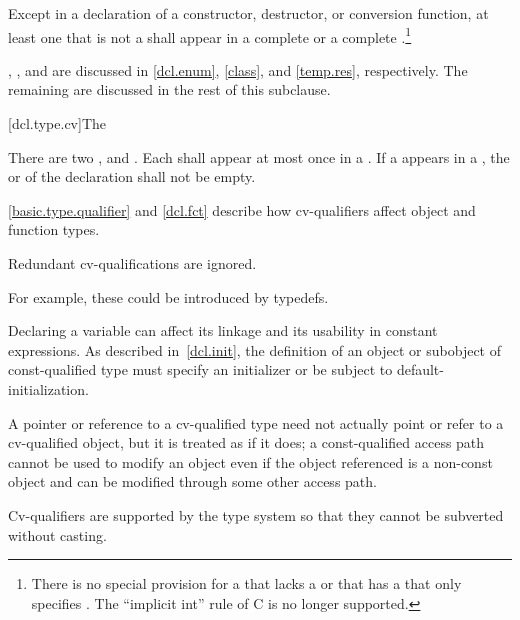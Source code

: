 \pnum
Except in a declaration of a constructor, destructor, or conversion
function, at least one  that is not a
 shall appear in a complete
 or a complete
.\footnote{There is no special
provision for a  that
lacks a  or that has a
 that only specifies .
The ``implicit int'' rule of C is no longer supported.}

\pnum
\begin{note}
,
,
and
are discussed
in
\ref{dcl.enum},
\ref{class},
and
\ref{temp.res}, respectively. The remaining
 are discussed in the rest of this subclause.
\end{note}

[dcl.type.cv]{The }%
%
%
%

\pnum
There are two ,  and
. Each  shall appear at most once in
a . If a  appears in a
, the 
or  of
the declaration shall not be empty.
\begin{note}
\ref{basic.type.qualifier} and \ref{dcl.fct} describe how cv-qualifiers affect object and
function types.
\end{note}
Redundant cv-qualifications are ignored. \begin{note} For example,
these could be introduced by typedefs.\end{note}

\pnum
\begin{note}
Declaring a variable  can affect its linkage
and its usability in constant expressions. As
described in~\ref{dcl.init}, the definition of an object or subobject
of const-qualified type must specify an initializer or be subject to
default-initialization.
\end{note}

\pnum
A pointer or reference to a cv-qualified type need not actually point or
refer to a cv-qualified object, but it is treated as if it does; a
const-qualified access path cannot be used to modify an object even if
the object referenced is a non-const object and can be modified through
some other access path.
\begin{note}
Cv-qualifiers are supported by the type system so that they cannot be
subverted without casting.
\end{note}

